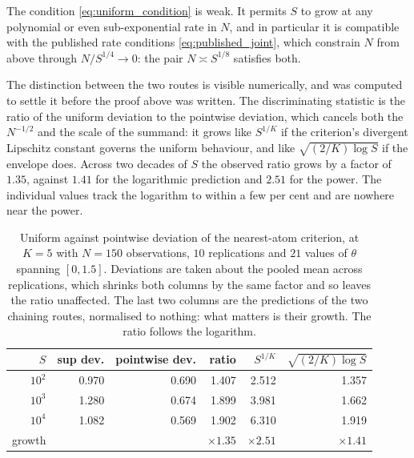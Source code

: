 \documentclass[11pt]{article}
\theoremstyle{definition}
\begin{document}
The condition \eqref{eq:uniform_condition} is weak. It permits $S$ to grow at any polynomial or even sub-exponential rate in $N$, and in particular it is compatible with the published rate conditions \eqref{eq:published_joint}, which constrain $N$ from above through $N/S^{1/4}\to0$: the pair $N\asymp S^{1/8}$ satisfies both.

The distinction between the two routes is visible numerically, and  was computed to settle it before the proof above was written. The discriminating statistic is the ratio of the uniform deviation to the pointwise deviation, which cancels both the $N^{-1/2}$ and the scale of the summand: it grows like $S^{1/K}$ if the criterion's divergent Lipschitz constant governs the uniform behaviour, and like $\sqrt{(2/K)\log S}$ if the envelope does. Across two decades of $S$ the observed ratio grows by a factor of $1.35$, against $1.41$ for the logarithmic prediction and $2.51$ for the power. The individual values track the logarithm to within a few per cent and are nowhere near the power.

\begin{table}[htbp]
\centering
\caption{Uniform against pointwise deviation of the nearest-atom criterion, at $K=5$ with $N=150$ observations, $10$ replications and $21$ values of $\theta$ spanning $[0,1.5]$. Deviations are taken about the pooled mean across replications, which shrinks both columns by the same factor and so leaves the ratio unaffected. The last two columns are the predictions of the two chaining routes, normalised to nothing: what matters is their growth. The ratio follows the logarithm.}
\label{tab:uniform_scaling}
\begin{tabular}{rrrrrr}
\toprule
$S$ & sup dev. & pointwise dev. & ratio & $S^{1/K}$ & $\sqrt{(2/K)\log S}$ \\
\midrule
$10^2$ & 0.970 & 0.690 & 1.407 & 2.512 & 1.357 \\
$10^3$ & 1.280 & 0.674 & 1.899 & 3.981 & 1.662 \\
$10^4$ & 1.082 & 0.569 & 1.902 & 6.310 & 1.919 \\
\midrule
growth & & & $\times1.35$ & $\times2.51$ & $\times1.41$ \\
\bottomrule
\end{tabular}
\end{table}

\FloatBarrier
\end{document}
